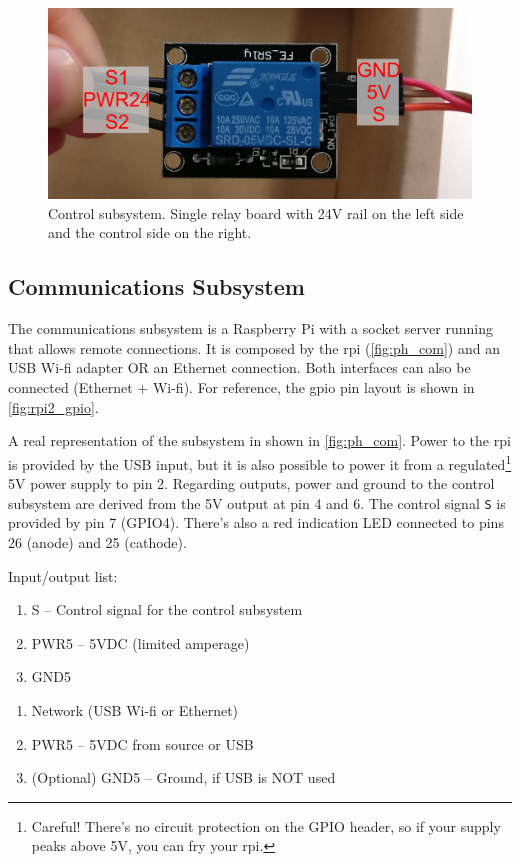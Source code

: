 \documentclass[twoside,a4paper]{refart}
\begin{document}
\begin{figure}[H]
	\centering
	\includegraphics[width=1.0\linewidth]{ph_control}
	\caption{Control subsystem. Single relay board with 24V rail on the left side and the control side on the right.}
	\label{fig:ph_control}
\end{figure}

\subsection{Communications Subsystem}
The communications subsystem is a Raspberry Pi with a socket server running that allows remote connections. It is composed by the \gls{rpi} (\cref{fig:ph_com}) and an USB Wi-fi adapter OR an Ethernet connection. Both interfaces can also be connected (Ethernet + Wi-fi). For reference, the \gls{gpio} pin layout is shown in \cref{fig:rpi2_gpio}.

A real representation of the subsystem in shown in \cref{fig:ph_com}. Power to the \gls{rpi} is provided by the \mu USB input, but it is also possible to power it from a regulated\footnote{Careful! There's no circuit protection on the GPIO header, so if your supply peaks above 5V, you can fry your \gls{rpi}.} 5V power supply to pin 2. Regarding outputs, power and ground to the control subsystem are derived from the 5V output at pin 4 and 6. The control signal {\tt S} is provided by pin 7 (GPIO4). There's also a red indication LED connected to pins 26 (anode) and 25 (cathode).



Input/output list:
\begin{enumerate}
	\item  {} S -- Control signal for the control subsystem
	\item PWR5 -- 5VDC (limited amperage)
	\item GND5
\end{enumerate}
\begin{enumerate}
	\item  {} Network (USB Wi-fi or Ethernet)
	\item PWR5 -- 5VDC from source or USB
	\item (Optional) GND5 -- Ground, if USB is NOT used
\end{enumerate}
\end{document}
